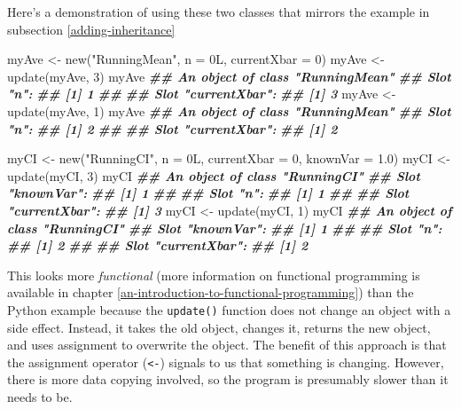 \documentclass[
  12pt,
  krantz2]{krantz}
\makeatletter
\newenvironment{Shaded}{\begin{snugshade}}{\end{snugshade}}
\newcommand{\AttributeTok}[1]{\textcolor[rgb]{0.61,0.61,0.61}{#1}}
\newcommand{\DecValTok}[1]{\textcolor[rgb]{0.06,0.06,0.06}{#1}}
\newcommand{\DocumentationTok}[1]{\textcolor[rgb]{0.37,0.37,0.37}{\textbf{\textit{#1}}}}
\newcommand{\FloatTok}[1]{\textcolor[rgb]{0.06,0.06,0.06}{#1}}
\newcommand{\FunctionTok}[1]{\textcolor[rgb]{0,0,0}{#1}}
\newcommand{\NormalTok}[1]{#1}
\newcommand{\OtherTok}[1]{\textcolor[rgb]{0.37,0.37,0.37}{#1}}
\newcommand{\StringTok}[1]{\textcolor[rgb]{0.5,0.5,0.5}{#1}}
\newenvironment{kframe}{%
\medskip{}
\setlength{\fboxsep}{.8em}
 \def\at@end@of@kframe{}%
 \ifinner\ifhmode%
  \def\at@end@of@kframe{\end{minipage}}%
  \begin{minipage}{\columnwidth}%
 \fi\fi%
 \def\FrameCommand##1{\hskip\@totalleftmargin \hskip-\fboxsep
 \colorbox{shadecolor}{##1}\hskip-\fboxsep
     \hskip-\linewidth \hskip-\@totalleftmargin \hskip\columnwidth}%
 \MakeFramed {\advance\hsize-\width
   \@totalleftmargin\z@ \linewidth\hsize
   \@setminipage}}%
 {\par\unskip\endMakeFramed%
 \at@end@of@kframe}
\renewenvironment{Shaded}{\begin{kframe}}{\end{kframe}}
\makeatother
\begin{document}
Here's a demonstration of using these two classes that mirrors the example in subsection \ref{adding-inheritance}

\begin{Shaded}
\begin{Highlighting}[]
\NormalTok{myAve }\OtherTok{\textless{}{-}} \FunctionTok{new}\NormalTok{(}\StringTok{"RunningMean"}\NormalTok{, }\AttributeTok{n =}\NormalTok{ 0L, }\AttributeTok{currentXbar =} \DecValTok{0}\NormalTok{)}
\NormalTok{myAve }\OtherTok{\textless{}{-}} \FunctionTok{update}\NormalTok{(myAve, }\DecValTok{3}\NormalTok{)}
\NormalTok{myAve}
\DocumentationTok{\#\# An object of class "RunningMean"}
\DocumentationTok{\#\# Slot "n":}
\DocumentationTok{\#\# [1] 1}
\DocumentationTok{\#\# }
\DocumentationTok{\#\# Slot "currentXbar":}
\DocumentationTok{\#\# [1] 3}
\NormalTok{myAve }\OtherTok{\textless{}{-}} \FunctionTok{update}\NormalTok{(myAve, }\DecValTok{1}\NormalTok{)}
\NormalTok{myAve}
\DocumentationTok{\#\# An object of class "RunningMean"}
\DocumentationTok{\#\# Slot "n":}
\DocumentationTok{\#\# [1] 2}
\DocumentationTok{\#\# }
\DocumentationTok{\#\# Slot "currentXbar":}
\DocumentationTok{\#\# [1] 2}

\NormalTok{myCI }\OtherTok{\textless{}{-}} \FunctionTok{new}\NormalTok{(}\StringTok{"RunningCI"}\NormalTok{, }\AttributeTok{n =}\NormalTok{ 0L, }\AttributeTok{currentXbar =} \DecValTok{0}\NormalTok{, }\AttributeTok{knownVar =} \FloatTok{1.0}\NormalTok{)}
\NormalTok{myCI }\OtherTok{\textless{}{-}} \FunctionTok{update}\NormalTok{(myCI, }\DecValTok{3}\NormalTok{)}
\NormalTok{myCI}
\DocumentationTok{\#\# An object of class "RunningCI"}
\DocumentationTok{\#\# Slot "knownVar":}
\DocumentationTok{\#\# [1] 1}
\DocumentationTok{\#\# }
\DocumentationTok{\#\# Slot "n":}
\DocumentationTok{\#\# [1] 1}
\DocumentationTok{\#\# }
\DocumentationTok{\#\# Slot "currentXbar":}
\DocumentationTok{\#\# [1] 3}
\NormalTok{myCI }\OtherTok{\textless{}{-}} \FunctionTok{update}\NormalTok{(myCI, }\DecValTok{1}\NormalTok{)}
\NormalTok{myCI}
\DocumentationTok{\#\# An object of class "RunningCI"}
\DocumentationTok{\#\# Slot "knownVar":}
\DocumentationTok{\#\# [1] 1}
\DocumentationTok{\#\# }
\DocumentationTok{\#\# Slot "n":}
\DocumentationTok{\#\# [1] 2}
\DocumentationTok{\#\# }
\DocumentationTok{\#\# Slot "currentXbar":}
\DocumentationTok{\#\# [1] 2}
\end{Highlighting}
\end{Shaded}

This looks more \emph{functional} (more information on functional programming is available in chapter \ref{an-introduction-to-functional-programming}) than the Python example because the \texttt{update()} function does not change an object with a side effect. Instead, it takes the old object, changes it, returns the new object, and uses assignment to overwrite the object. The benefit of this approach is that the assignment operator (\texttt{\textless{}-})  signals to us that something is changing. However, there is more data copying involved, so the program is presumably slower than it needs to be.
\end{document}
